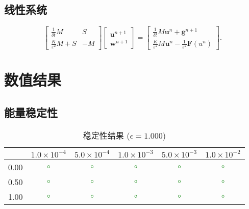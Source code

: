 \documentclass[12pt,a4paper]{article}
\begin{document}
\subsection{线性系统}

\[
\begin{bmatrix}
	\frac{1}{\delta t} M & S \\
	\frac{K}{\varepsilon^2} M + S & -M
\end{bmatrix}
\begin{bmatrix}
	\mathbf{u}^{n+1} \\
	\mathbf{w}^{n+1}
\end{bmatrix}
=
\begin{bmatrix}
	\frac{1}{\delta t} M \mathbf{u}^n + \mathbf{g}^{n+1} \\
	\frac{K}{\varepsilon^2} M \mathbf{u}^n - \frac{1}{\varepsilon^2} \mathbf{F}(u^n)
\end{bmatrix}.
\]

\section{数值结果}

\subsection{能量稳定性}

\begin{table}[htbp]
	\centering
	\caption{稳定性结果 ($\epsilon = 1.000$)}
	\begin{tabular}{c|ccccc}
		\toprule
		\diagbox{K}{$\Delta t$} & $1.0 \times 10^{-4}$ & $5.0 \times 10^{-4}$ & $1.0 \times 10^{-3}$ & $5.0 \times 10^{-3}$ & $1.0 \times 10^{-2}$ \\
		\midrule
		0.00 & \textcolor{green}{$\circ$} & \textcolor{green}{$\circ$} & \textcolor{green}{$\circ$} & \textcolor{green}{$\circ$} & \textcolor{green}{$\circ$} \\
		0.50 & \textcolor{green}{$\circ$} & \textcolor{green}{$\circ$} & \textcolor{green}{$\circ$} & \textcolor{green}{$\circ$} & \textcolor{green}{$\circ$} \\
		1.00 & \textcolor{green}{$\circ$} & \textcolor{green}{$\circ$} & \textcolor{green}{$\circ$} & \textcolor{green}{$\circ$} & \textcolor{green}{$\circ$} \\
		\bottomrule
	\end{tabular}
\end{table}
\end{document}
